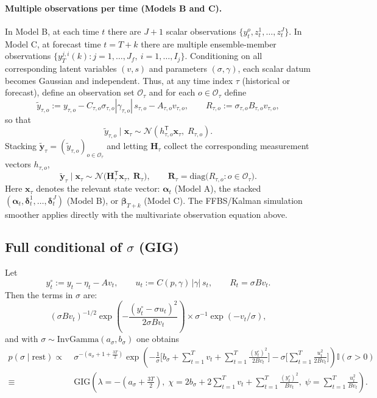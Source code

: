 \documentclass[11pt]{article}
\newcommand{\1}{\mathbb{I}}
\newcommand{\N}{\mathcal{N}}
\newcommand{\IG}{\mathrm{InvGamma}}
\newcommand{\GIG}{\mathrm{GIG}}
\newcommand{\diag}{\mathrm{diag}}
\newcommand{\T}{\mathsf{T}}
\begin{document}
\paragraph{Multiple observations per time (Models B and C).}
In Model B, at each time $t$ there are $J{+}1$ scalar observations $\{y_t^o,z_t^1,\dots,z_t^J\}$.
In Model C, at forecast time $t=T+k$ there are multiple ensemble-member observations
$\{y_T^{j,i}(k): j=1,\dots,J_f,\ i=1,\dots,I_j\}$.
Conditioning on all corresponding latent variables $(v,s)$ and parameters $(\sigma,\gamma)$, each scalar datum becomes Gaussian and independent.
Thus, at any time index $\tau$ (historical or forecast), define an observation set $\mathcal{O}_\tau$ and for each $o\in\mathcal{O}_\tau$ define
\[
\tilde y_{\tau,o} := y_{\tau,o}-C_{\tau,o}\sigma_{\tau,o}|\gamma_{\tau,o}|\,s_{\tau,o}-A_{\tau,o}v_{\tau,o},
\qquad
R_{\tau,o}:=\sigma_{\tau,o}B_{\tau,o}v_{\tau,o},
\]
so that
\[
\tilde y_{\tau,o}\mid \bm x_\tau \sim \N(h_{\tau,o}^\T \bm x_\tau,\;R_{\tau,o}).
\]
Stacking $\tilde{\bm y}_\tau=(\tilde y_{\tau,o})_{o\in\mathcal{O}_\tau}$ and letting $\bm H_\tau$ collect the corresponding measurement vectors $h_{\tau,o}$,
\[
\tilde{\bm y}_\tau\mid \bm x_\tau \sim \N\!\big(\bm H_\tau^\T \bm x_\tau,\;\bm R_\tau\big),
\qquad
\bm R_\tau=\diag\big(R_{\tau,o}:o\in\mathcal{O}_\tau\big).
\]
Here $\bm x_\tau$ denotes the relevant state vector: $\bm\alpha_t$ (Model A), the stacked $(\bm\alpha_t,\bm\delta_t^1,\dots,\bm\delta_t^J)$ (Model B),
or $\bm\beta_{T+k}$ (Model C). The FFBS/Kalman simulation smoother applies directly with the multivariate observation equation above.

\subsection{Full conditional of \texorpdfstring{$\sigma$}{sigma} (GIG)}

Let
\[
y_t^\circ := y_t - \eta_t - A v_t,
\qquad
u_t := C(p,\gamma)\,|\gamma|\,s_t,
\qquad
R_t=\sigma B v_t.
\]
Then the terms in $\sigma$ are:
\[
(\sigma B v_t)^{-1/2}\exp\!\left(-\frac{(y_t^\circ-\sigma u_t)^2}{2\sigma B v_t}\right)\times
\sigma^{-1}\exp(-v_t/\sigma),
\]
and with $\sigma\sim \IG(a_\sigma,b_\sigma)$ one obtains
\begin{align}
p(\sigma\mid \text{rest})
\propto\;&
\sigma^{-(a_\sigma+1+\tfrac{3T}{2})}
\exp\!\left(
-\frac{1}{\sigma}\Big[b_\sigma+\sum_{t=1}^T v_t+\sum_{t=1}^T\frac{(y_t^\circ)^2}{2Bv_t}\Big]
-\sigma\Big[\sum_{t=1}^T\frac{u_t^2}{2Bv_t}\Big]
\right)\1(\sigma>0)\nonumber\\
\equiv\;&
\GIG\!\left(
\lambda=-(a_\sigma+\tfrac{3T}{2}),\;
\chi=2b_\sigma+2\sum_{t=1}^T v_t+\sum_{t=1}^T\frac{(y_t^\circ)^2}{Bv_t},\;
\psi=\sum_{t=1}^T\frac{u_t^2}{Bv_t}
\right).\label{eq:cond_sigma}
\end{align}
\end{document}
